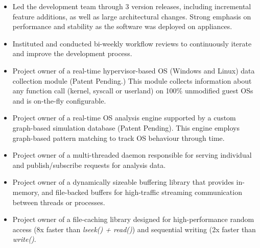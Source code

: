\documentclass[margin]{res}
\begin{document}
\begin{resume}
\begin{itemize}
  \item Led the development team through 3 version releases, including
    incremental feature additions, as well as large architectural
    changes.  Strong emphasis on performance and stability as the
    software was deployed on appliances.
  \item Instituted and conducted bi-weekly workflow reviews to
    continuously iterate and improve the development process.
  \item Project owner of a real-time hypervisor-based OS (Windows and
    Linux) data collection module (Patent Pending.)  This module
    collects information about any function call (kernel, syscall or
    userland) on 100\% unmodified guest OSs and is on-the-fly
    configurable.
  \item Project owner of a real-time OS analysis engine supported by a
    custom graph-based simulation database (Patent Pending).  This
    engine employs graph-based pattern matching to track OS behaviour
    through time.
  \item Project owner of a multi-threaded daemon responsible for
    serving individual and publish/subscribe requests for analysis
    data.
  \item Project owner of a dynamically sizeable buffering library that
    provides in-memory, and file-backed buffers for high-traffic
    streaming communication between threads or processes.
  \item Project owner of a file-caching library designed for
    high-performance random access (8x faster than {\em lseek() +
      read()}) and sequential writing (2x faster than {\em
      write()}.
\end{itemize}


\end{resume}
\end{document}
